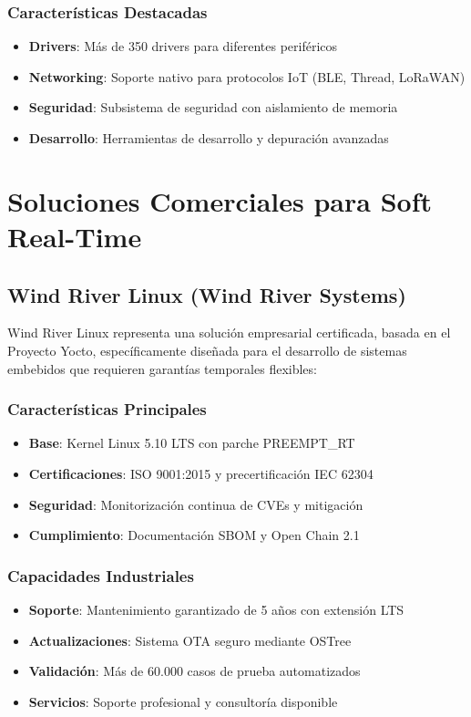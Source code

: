         \subsubsection{Características Destacadas}
        \begin{itemize}
            \item \textbf{Drivers}: Más de 350 drivers para diferentes periféricos
            \item \textbf{Networking}: Soporte nativo para protocolos IoT (BLE, Thread, LoRaWAN)
            \item \textbf{Seguridad}: Subsistema de seguridad con aislamiento de memoria
            \item \textbf{Desarrollo}: Herramientas de desarrollo y depuración avanzadas
        \end{itemize}

\newpage
\section{Soluciones Comerciales para Soft Real-Time}

    \subsection{Wind River Linux (Wind River Systems)}
    Wind River Linux representa una solución empresarial certificada, basada en el Proyecto Yocto, específicamente diseñada para el desarrollo de sistemas embebidos que requieren garantías temporales flexibles:

        \subsubsection{Características Principales}
        \begin{itemize}
            \item \textbf{Base}: Kernel Linux 5.10 LTS con parche PREEMPT\_RT
            \item \textbf{Certificaciones}: ISO 9001:2015 y precertificación IEC 62304
            \item \textbf{Seguridad}: Monitorización continua de CVEs y mitigación
            \item \textbf{Cumplimiento}: Documentación SBOM y Open Chain 2.1
        \end{itemize}

        \subsubsection{Capacidades Industriales}
        \begin{itemize}
            \item \textbf{Soporte}: Mantenimiento garantizado de 5 años con extensión LTS
            \item \textbf{Actualizaciones}: Sistema OTA seguro mediante OSTree
            \item \textbf{Validación}: Más de 60.000 casos de prueba automatizados
            \item \textbf{Servicios}: Soporte profesional y consultoría disponible
        \end{itemize}

